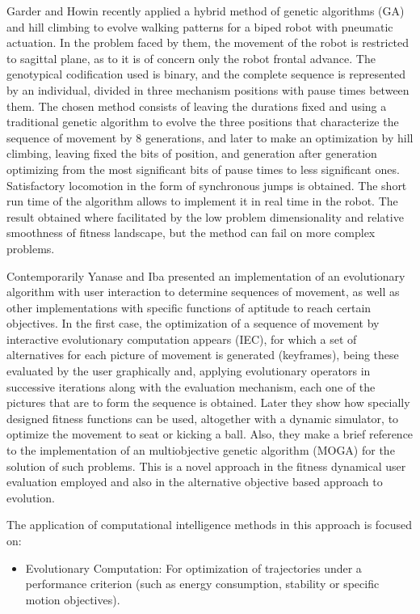 Garder and Howin \cite{Garder06Robot} recently applied a hybrid method
of genetic algorithms (GA) and hill climbing to evolve walking
patterns for a biped robot with pneumatic actuation. In the problem
faced by them, the movement of the robot is restricted to sagittal
plane, as to it is of concern only the robot frontal advance. The
genotypical codification used is binary, and the complete sequence is
represented by an individual, divided in three mechanism positions
with pause times between them. The chosen method consists of leaving
the durations fixed and using a traditional genetic algorithm to
evolve the three positions that characterize the sequence of movement
by 8 generations, and later to make an optimization by hill climbing,
leaving fixed the bits of position, and generation after generation
optimizing from the most significant bits of pause times to less
significant ones. Satisfactory locomotion in the form of synchronous
jumps is obtained. The short run time of the algorithm allows to
implement it in real time in the robot. The result obtained where
facilitated by the low problem dimensionality and relative smoothness
of fitness landscape, but the method can fail on more complex
problems.


Contemporarily Yanase and Iba \cite{Yanase06Evolutionary} presented an
implementation of an evolutionary algorithm with user interaction to
determine sequences of movement, as well as other implementations with
specific functions of aptitude to reach certain objectives. In the
first case, the optimization of a sequence of movement by interactive
evolutionary computation appears (IEC), for which a set of
alternatives for each picture of movement is generated (keyframes),
being these evaluated by the user graphically and, applying
evolutionary operators in successive iterations along with the
evaluation mechanism, each one of the pictures that are to form the
sequence is obtained. Later they show how specially designed fitness
functions can be used, altogether with a dynamic simulator, to
optimize the movement to seat or kicking a ball. Also, they make a
brief reference to the implementation of an multiobjective genetic
algorithm (MOGA) for the solution of such problems. This is a novel
approach in the fitness dynamical user evaluation employed and also in
the alternative objective based approach to evolution.

The application of computational intelligence methods in this approach
is focused on:
\begin{itemize}
\item Evolutionary Computation: For optimization of trajectories under
  a performance criterion (such as energy consumption, stability or
  specific motion objectives).
\end{itemize}

